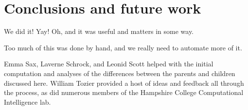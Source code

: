 

\section{Conclusions and future work}
\label{sec:conclusions}

We did it! Yay! Oh, and it was useful and matters in some way.

Too much of this was done by hand, and we really need to automate more of it.

\begin{acknowledgement}
	Emma Sax, Laverne Schrock, and Leonid Scott helped 
	with the initial computation and analyses of the differences between the 
	parents and children discussed here. William Tozier provided a host of 
	ideas and feedback all through the process, as did numerous members
	of the Hampshire College Computational Intelligence lab.
\end{acknowledgement}




